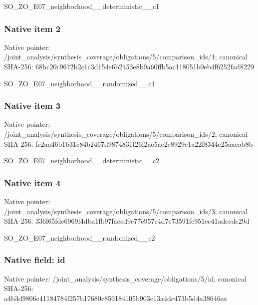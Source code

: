 \documentclass[10pt,a4paper]{article}
\begin{document}
\begingroup\raggedright\sloppy SO\_\allowbreak{}ZO\_\allowbreak{}E07\_\allowbreak{}neighborhood\_\allowbreak{}\_\allowbreak{}deterministic\_\allowbreak{}\_\allowbreak{}c1\par\endgroup

\subsubsection{Native item 2}
Native pointer: /joint\_\allowbreak{}analysis/synthesis\_\allowbreak{}coverage/obligations/5/comparison\_\allowbreak{}ids/1; canonical SHA-256: 68bc20c9672b2c1c3d154e6b2453e8b9a60ffb5ac118051b0eb4f6252fad8229

\begingroup\raggedright\sloppy SO\_\allowbreak{}ZO\_\allowbreak{}E07\_\allowbreak{}neighborhood\_\allowbreak{}\_\allowbreak{}randomized\_\allowbreak{}\_\allowbreak{}c1\par\endgroup

\subsubsection{Native item 3}
Native pointer: /joint\_\allowbreak{}analysis/synthesis\_\allowbreak{}coverage/obligations/5/comparison\_\allowbreak{}ids/2; canonical SHA-256: fc2aa46b1b31c84b2467d9874831f26f2ae5ae2e8929e1a22f8344e25aacab8b

\begingroup\raggedright\sloppy SO\_\allowbreak{}ZO\_\allowbreak{}E07\_\allowbreak{}neighborhood\_\allowbreak{}\_\allowbreak{}deterministic\_\allowbreak{}\_\allowbreak{}c2\par\endgroup

\subsubsection{Native item 4}
Native pointer: /joint\_\allowbreak{}analysis/synthesis\_\allowbreak{}coverage/obligations/5/comparison\_\allowbreak{}ids/3; canonical SHA-256: 336f65fdc6969f4dba1fb97faeed9e77e957c4d7c73591fc951ec41adccdc29d

\begingroup\raggedright\sloppy SO\_\allowbreak{}ZO\_\allowbreak{}E07\_\allowbreak{}neighborhood\_\allowbreak{}\_\allowbreak{}randomized\_\allowbreak{}\_\allowbreak{}c2\par\endgroup

\subsubsection{Native field: id}
Native pointer: /joint\_\allowbreak{}analysis/synthesis\_\allowbreak{}coverage/obligations/5/id; canonical SHA-256: a4b3d9806c41184784f257b17680c859184105b903c13a4dc473b5d4a38646ea
\end{document}
